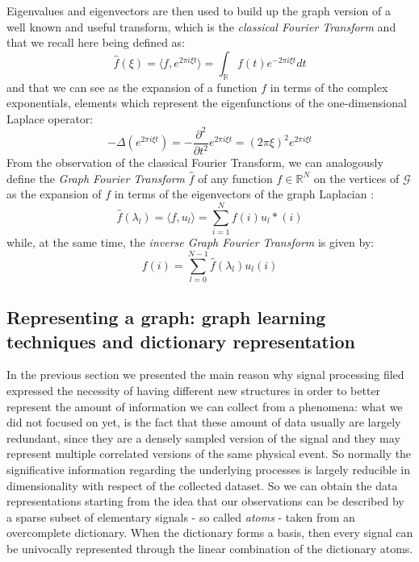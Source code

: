\documentclass[11pt,a4paper,titlepage]{article}
\newcommand{\R}{\mathbb{R}}
\begin{document}
Eigenvalues and eigenvectors are then used to build up the graph version of a well known and useful transform, which is the \textit{classical Fourier Transform} and that we recall here being defined as:
\begin{equation}
\hat{f}(\xi) = \langle f, e^{2\pi i \xi t}\rangle = \int_{\R} f(t)e^{-2\pi i \xi t} dt
\end{equation}
and that we can see as the expansion of a function $f$ in terms of the complex exponentials, elements which represent the eigenfunctions of the one-dimensional Laplace operator:
\begin{equation}
-\Delta(e^{2\pi i \xi t}) = -\frac{\partial^2}{\partial t^2}e^{2\pi i \xi t} = (2\pi\xi)^2e^{2\pi i \xi t}
\end{equation}
From the observation of the classical Fourier Transform, we can analogously define the \textit{Graph Fourier Transform} $\hat{f}$ of any function $f \in \R^N$ on the vertices of $\mathcal{G}$ as the expansion of $f$ in terms of the eigenvectors of the graph Laplacian \cite{Shuman2013}:
\begin{equation}
\hat{f}(\lambda_l) = \langle f, u_l \rangle = \sum^{N}_{i=1}f(i)u_l*(i)
\end{equation}
while, at the same time, the \textit{inverse Graph Fourier Transform} is given by:
\begin{equation}
f(i) = \sum^{N-1}_{l = 0}\hat{f}(\lambda_l)u_l(i)
\end{equation}

\subsection{Representing a graph: graph learning techniques and dictionary representation}
In the previous section we presented the main reason why signal processing filed expressed the necessity of having different new structures in order to better represent the amount of information we can collect from a phenomena: what we did not focused on yet, is the fact that these amount of data usually are largely redundant, since they are a densely sampled version of the signal and they may represent multiple correlated versions of the same physical event. So normally the significative information regarding the underlying processes is largely reducible in dimensionality with respect of the collected dataset. \cite{Tosic2011} So we can obtain the data representations starting from the idea that our observations can be described by a sparse subset of elementary signals - so called \textit{atoms} - taken from an overcomplete dictionary. When the dictionary forms a basis, then every signal can be univocally represented through the linear combination of the dictionary atoms. \cite{Rubinstein2010}
\end{document}
